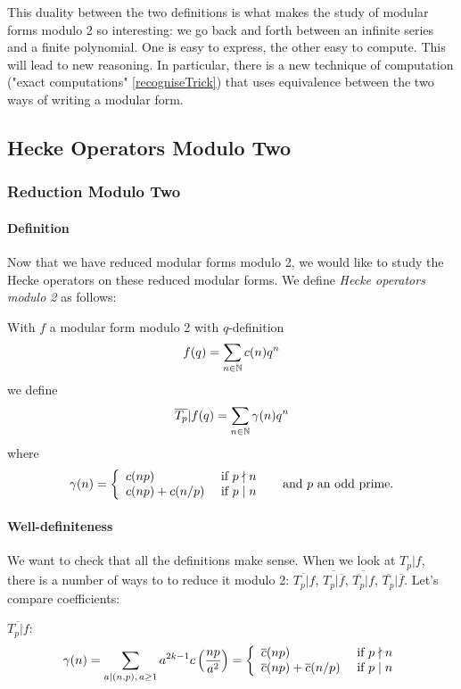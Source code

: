 This duality between the two definitions is what makes the study of modular forms modulo 2 so interesting:
we go back and forth between an infinite series and a finite polynomial.
One is easy to express, the other easy to compute.
This will lead to new reasoning.
In particular, there is a new technique of computation ("exact computations" \ref{recogniseTrick}) that uses equivalence between the two ways of writing a modular form.



\subsection{Hecke Operators Modulo Two}
\subsubsection{Reduction Modulo Two}
\paragraph{Definition}
\label{DefHeckeOperatorsMod2}
Now that we have reduced modular forms modulo 2, we would like to study the Hecke operators on these reduced modular forms. We define \textit{Hecke operators modulo 2} as follows:

With $f$ a modular form modulo 2 with $q$-definition
$$
f(q) = \sum_{n \in \mathbb{N}} c(n)q^n
$$
we define
$$
\overline{T_p}|f(q) = \sum_{n \in \mathbb{N}} \gamma(n)q^n
$$
where
$$
\gamma(n) = 
\left\lbrace
\begin{array}{l l}
  c(np)        & \text{ if } p \nmid n \\
  c(np)+c(n/p) & \text{ if } p \mid  n
\end{array}
\right. 
\quad \text{ and } p \text{ an odd prime}.
$$

\paragraph{Well-definiteness}
We want to check that all the definitions make sense. When we look at $T_p|f$, there is a number of ways to to reduce it modulo 2: $\overline{T_p|f}$, $\overline{T_p|\overline{f}}$, $\overline{\overline{T_p}|f}$, $\overline{T_p}|\overline{f}$.
Let's compare coefficients:

$\overline{T_p|f}$:
$$
\gamma(n) 
= \sum_{a \mid (n,p),\, a \geq 1} a^{2k-1} c\left( \frac{np}{a^2} \right)
= \left\lbrace
\begin{array}{l l}
  \overline{c}(np)                   & \text{ if } p \nmid n \\
  \overline{c}(np)+\overline{c}(n/p) & \text{ if } p \mid  n
\end{array}
\right.
$$

